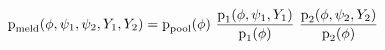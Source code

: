 \begin{equation*}
  \text{p}_{\text{meld}} (\phi, \psi_{1}, \psi_{2}, Y_{1}, Y_{2})
  =
  \text{p}_{\text{pool}}(\phi) \,\,
  \frac {
    \text{p}_{1}(\phi, \psi_{1}, Y_{1})
  } {
    \text{p}_{1}(\phi)
  }
  \,\,
  \frac {
    \text{p}_{2}(\phi, \psi_{2}, Y_{2})
  } {
    \text{p}_{2}(\phi)
  }
\end{equation*}